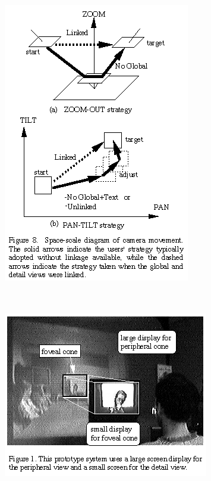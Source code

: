 \documentclass{beamer}
\begin{document}
\begin{frame}
\frametitle{}


\begin{columns}

\centerline{\includegraphics[width=0.500000\linewidth,keepaspectratio]{ky_fg8.png}}

\end{columns}

\end{frame}

\begin{frame}
\frametitle{}


\begin{columns}

\centerline{\includegraphics[width=0.500000\linewidth,keepaspectratio]{ky_fg1.png}}

\end{columns}

\end{frame}
\end{document}
